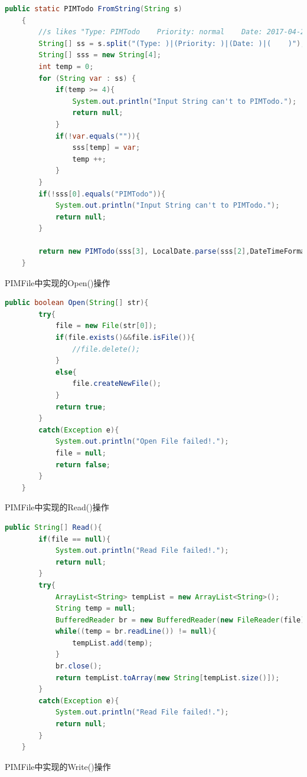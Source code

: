 \documentclass[a4paper]{article}
\begin{document}
\begin{lstlisting}[language=Java]
    public static PIMTodo FromString(String s)
    {
        //s likes "Type: PIMTodo    Priority: normal    Date: 2017-04-20    text""
        String[] ss = s.split("(Type: )|(Priority: )|(Date: )|(    )");
        String[] sss = new String[4];
        int temp = 0;
        for (String var : ss) {
            if(temp >= 4){
                System.out.println("Input String can't to PIMTodo.");
                return null;
            }
            if(!var.equals("")){
                sss[temp] = var;
                temp ++;
            }
        }
        if(!sss[0].equals("PIMTodo")){
            System.out.println("Input String can't to PIMTodo.");
            return null;
        }

        return new PIMTodo(sss[3], LocalDate.parse(sss[2],DateTimeFormatter.ofPattern("yyyy-MM-dd")), sss[1]);
    }
\end{lstlisting}


PIMFile中实现的Open()操作

\begin{lstlisting}[language=Java]
    public boolean Open(String[] str){
        try{
            file = new File(str[0]);
            if(file.exists()&&file.isFile()){
                //file.delete();
            }
            else{
                file.createNewFile();
            }
            return true;
        }
        catch(Exception e){
            System.out.println("Open File failed!.");
            file = null;
            return false;
        }
    }
\end{lstlisting}

PIMFile中实现的Read()操作

\begin{lstlisting}[language=Java]
    public String[] Read(){
        if(file == null){
            System.out.println("Read File failed!.");
            return null;
        }
        try{
            ArrayList<String> tempList = new ArrayList<String>();
            String temp = null;
            BufferedReader br = new BufferedReader(new FileReader(file));
            while((temp = br.readLine()) != null){
                tempList.add(temp);
            }
            br.close();
            return tempList.toArray(new String[tempList.size()]);
        }
        catch(Exception e){
            System.out.println("Read File failed!.");
            return null;
        }
    }
\end{lstlisting}

PIMFile中实现的Write()操作
\end{document}
